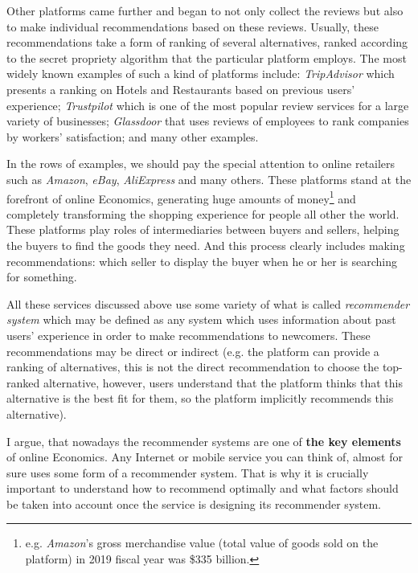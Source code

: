 \documentclass[a4paper]{article}
\begin{document}
	
	
	
	
Other platforms came further and began to not only collect the reviews but also to make individual recommendations based on these reviews. Usually, these recommendations take a form of ranking of several alternatives, ranked according to the secret propriety algorithm that the particular platform employs. The most widely known examples of such a kind of platforms include: \textit{TripAdvisor} which presents a ranking on Hotels and Restaurants based on previous users' experience; \textit{Trustpilot} which is one of the most popular review services for a large variety of businesses; \textit{Glassdoor} that uses reviews of employees to rank companies by workers' satisfaction; and many other examples. 
	
	
	
	
In the rows of examples, we should pay the special attention to online retailers such as \textit{Amazon}, \textit{eBay}, \textit{AliExpress} and many others. These platforms stand at the forefront of online Economics, generating huge amounts of money\footnote{e.g. \textit{Amazon}'s gross merchandise value (total value of goods sold on the platform) in 2019 fiscal year was \$335 billion.} and completely transforming the shopping experience for people all other the world. These platforms play roles of intermediaries between buyers and sellers, helping the buyers to find the goods they need. And this process clearly includes making recommendations: which seller to display the buyer when he or her is searching for something.	
	
	
	All these services discussed above use some variety of what is called \textit{recommender system} which may be defined as any system which uses information about past users' experience in order to make recommendations to newcomers. These recommendations may be direct or indirect (e.g. the platform can provide a ranking of alternatives, this is not the direct recommendation to choose the top-ranked alternative, however, users understand that the platform thinks that this alternative is the best fit for them, so the platform implicitly recommends this alternative). 
	
	
	
	
	
I argue, that nowadays the recommender systems are one of \textbf{the key elements} of online Economics. Any Internet or mobile service you can think of, almost for sure uses some form of a recommender system. That is why it is crucially important to understand how to recommend optimally and what factors should be taken into account once the service is designing its recommender system.
	
\end{document}
